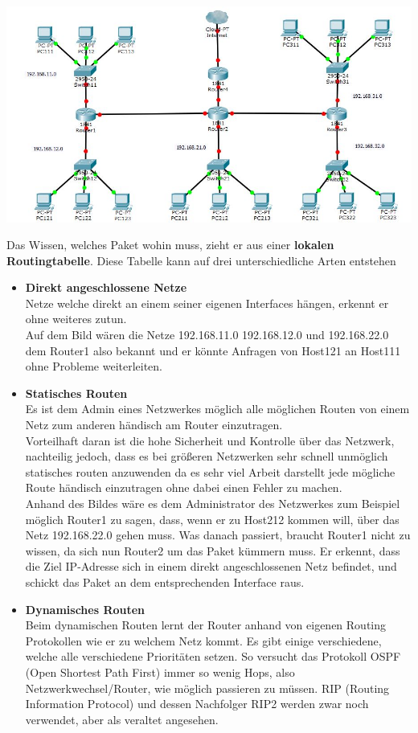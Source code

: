 \documentclass[12pt,a4paper]{report}
\begin{document}
\begin{center}
\includegraphics[scale=0.5]{../docs/tarkes/pics/RouterNetwork.jpg}\label{fig:bspNetwork}
\end{center}

Das Wissen, welches Paket wohin muss, zieht er aus einer \textbf{lokalen Routingtabelle}. Diese Tabelle kann auf drei unterschiedliche Arten entstehen\\
\begin{itemize}
\item \textbf{Direkt angeschlossene Netze}\\
Netze welche direkt an einem seiner eigenen Interfaces hängen, erkennt er ohne weiteres zutun.\\
Auf dem Bild wären die Netze 192.168.11.0 192.168.12.0 und 192.168.22.0 dem Router1 also bekannt und er könnte Anfragen von Host121 an Host111 ohne Probleme weiterleiten.
\item \textbf{Statisches Routen}\\
Es ist dem Admin eines Netzwerkes möglich alle möglichen Routen von einem Netz zum anderen händisch am Router einzutragen.\\
Vorteilhaft daran ist die hohe Sicherheit und Kontrolle über das Netzwerk, nachteilig jedoch, dass es bei größeren Netzwerken sehr schnell unmöglich statisches routen anzuwenden da es sehr viel Arbeit darstellt jede mögliche Route händisch einzutragen ohne dabei einen Fehler zu machen.\\
Anhand des Bildes wäre es dem Administrator des Netzwerkes zum Beispiel möglich Router1 zu sagen, dass, wenn er zu Host212 kommen will, über das Netz 192.168.22.0 gehen muss. Was danach passiert, braucht Router1 nicht zu wissen, da sich nun Router2 um das Paket kümmern muss. Er erkennt, dass die Ziel IP-Adresse sich in einem direkt angeschlossenen Netz befindet, und schickt das Paket an dem entsprechenden Interface raus.
\item \textbf{Dynamisches Routen}\\
Beim dynamischen Routen lernt der Router anhand von eigenen Routing Protokollen wie er zu welchem Netz kommt. Es gibt einige verschiedene, welche alle verschiedene Prioritäten setzen. So versucht das Protokoll OSPF (Open Shortest Path First) immer so wenig Hops, also Netzwerkwechsel/Router, wie möglich passieren zu müssen. RIP (Routing Information Protocol) und dessen Nachfolger RIP2 werden zwar noch verwendet, aber als veraltet angesehen.
\end{itemize}
\end{document}
